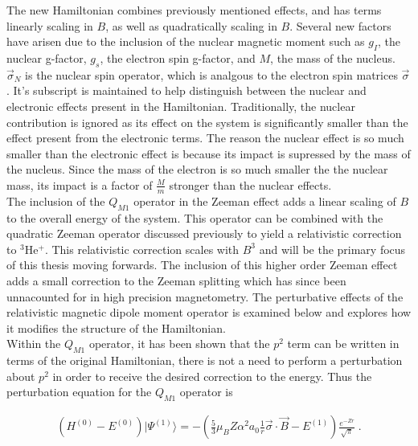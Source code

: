            \noindent The new Hamiltonian combines previously mentioned effects, and has terms linearly scaling in $B$, as well as quadratically scaling in $B$. Several new factors have arisen due to the inclusion of the nuclear magnetic moment such as $g_I$, the nuclear g-factor, $g_s$, the electron spin g-factor, and $M$, the mass of the nucleus. $\vec{\sigma}_N$ is the nuclear spin operator, which is analgous to the electron spin matrices $\vec{\sigma}$. It's subscript is maintained to help distinguish between the nuclear and electronic effects present in the Hamiltonian. Traditionally, the nuclear contribution is ignored as its effect on the system is significantly smaller than the effect present from the electronic terms. The reason the nuclear effect is so much smaller than the electronic effect is because its impact is supressed by the mass of the nucleus. Since the mass of the electron is so much smaller the the nuclear mass, its impact is a factor of $\frac{M}{m}$ stronger than the nuclear effects.\\

            The inclusion of the $Q_{M1}$ operator in the Zeeman effect adds a linear scaling of $B$ to the overall energy of the system. This operator can be combined with the quadratic Zeeman operator discussed previously to yield a relativistic correction to $^3$He$^+$. This relativistic correction scales with $B^3$ and will be the primary focus of this thesis moving forwards. The inclusion of this higher order Zeeman effect adds a small correction to the Zeeman splitting which has since been unnacounted for in high precision magnetometry. The perturbative effects of the relativistic magnetic dipole moment operator is examined below and explores how it modifies the structure of the Hamiltonian. \\
            
            Within the $Q_{M1}$ operator, it has been shown that the $p^2$ term can be written in terms of the original Hamiltonian, there is not a need to perform a perturbation about $p^2$ in order to receive the desired correction to the energy. Thus the perturbation equation for the $Q_{M1}$ operator is


            \begin{align}
                \left(H^{(0)} - E^{(0)}\right) \vert \varPsi^{(1)}\rangle = -\left(\frac{5}{3}\mu_B Z \alpha^2 a_0 \frac{1}{r} \vec{\sigma} \cdot \vec{B} - E^{(1)} \right) \frac{e^{-Zr}}{\sqrt{\pi}}\;.
            \end{align}

